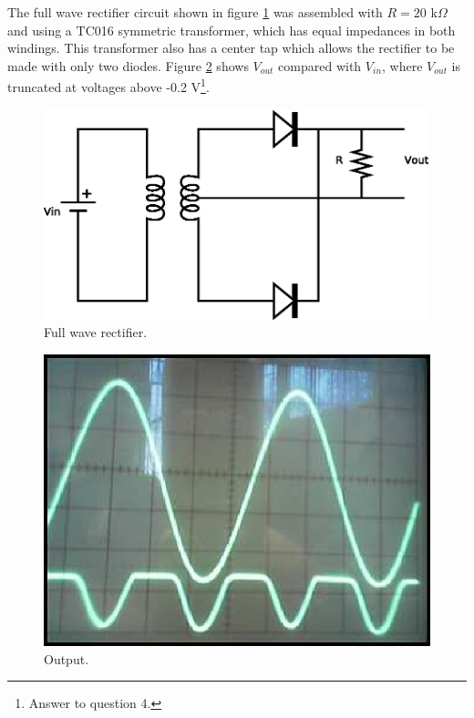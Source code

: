 \documentclass[11pt,onecolumn]{article}
\begin{document}
The full wave rectifier circuit shown in figure \ref{fig:Full_wave_rectifier} was assembled with $R = 20$ k$\Omega$ and using a TC016 symmetric transformer, which has equal impedances in both windings. This transformer also has a center tap which allows the rectifier to be made with only two diodes. Figure \ref{fig:Image3} shows $V_{out}$ compared with $V_{in}$, where  $V_{out}$ is truncated at voltages above -0.2 V\footnote{Answer to question 4.}.
%
%
\begin{figure}
\begin{center}
\includegraphics{Diagram2.eps}
\end{center}
\caption{Full wave rectifier.}\label{fig:Full_wave_rectifier}
\end{figure}
%
%
\begin{figure}
\begin{center}
\includegraphics{Image3.eps}
\end{center}
\caption{Output.}\label{fig:Image3}
\end{figure}
\end{document}
